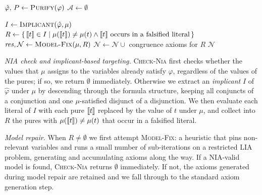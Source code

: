\begin{algorithm}[t]
	\caption{\textsc{Qf-Nia-Solve}($\varphi$)}\label{alg:solve}
	\DontPrintSemicolon
	$\hat\varphi,\, P \leftarrow \textsc{Purify}(\varphi)$\;
	$\mathcal{A} \leftarrow \emptyset$\;
\end{algorithm}

\begin{algorithm}[t]
	\caption{\textsc{Check-Nia}($\varphi, \hat\varphi, P, \mu, \mathcal{A}$)}\label{alg:checknia}
	\DontPrintSemicolon
	$I \leftarrow \textsc{Implicant}(\hat\varphi, \mu)$\;
	$R \leftarrow \{\,\llbracket t \rrbracket \in I \mid \mu(\llbracket t \rrbracket) \neq \mu(t)
		\wedge \llbracket t \rrbracket\text{ occurs in a falsified literal}\,\}$\;
	$\mathit{res}, \mathcal{N} \leftarrow \textsc{Model-Fix}(\mu, R)$\;
	$\mathcal{N} \leftarrow \mathcal{N} \cup {}$ congruence axioms for $R$\;
	\Return $\mathcal{N}$\;
\end{algorithm}

\emph{NIA check and implicant-based targeting.}
\textsc{Check-Nia} first checks whether the values that $\mu$ assigns to the
variables already satisfy $\varphi$, regardless of the values of the pures;
if so, we return $\emptyset$ immediately.
Otherwise we extract an \emph{implicant} $I$ of $\hat\varphi$ under $\mu$ by
descending through the formula structure, keeping all conjuncts of a
conjunction and one $\mu$-satisfied disjunct of a disjunction.
We then evaluate each literal of $I$ with each pure $\llbracket t \rrbracket$ replaced by
the value of $t$ under $\mu$, and collect into $R$ the pures with
$\mu(\llbracket t \rrbracket) \neq \mu(t)$ that occur in a falsified literal.

\emph{Model repair.}
When $R \neq \emptyset$ we first attempt \textsc{Model-Fix}: a heuristic that pins
non-relevant variables and runs a small number of sub-iterations on a
restricted LIA problem, generating and accumulating axioms along the way.
If a NIA-valid model is found, \textsc{Check-Nia} returns $\emptyset$ immediately.
If not, the axioms generated during model repair are retained and we fall
through to the standard axiom generation step.

